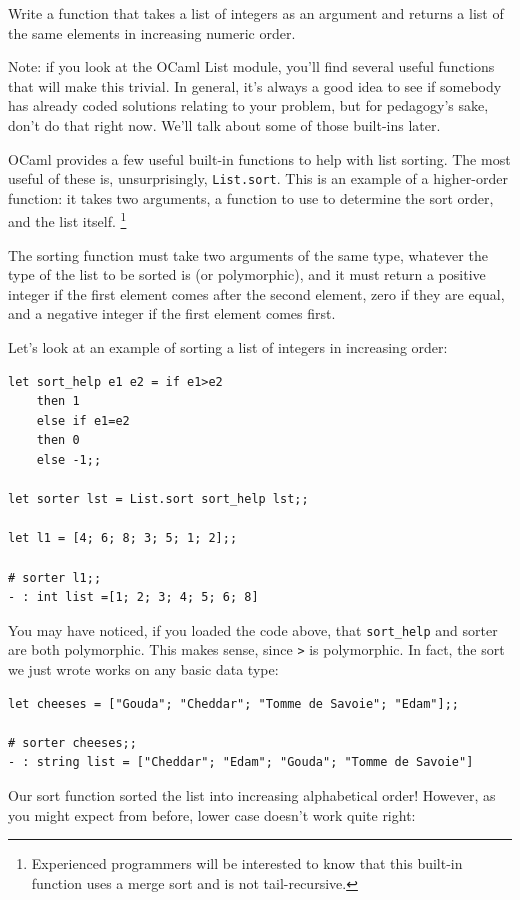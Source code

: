 \documentclass[10pt]{book}
\begin{document}
\begin{ex}
Write a function that takes a list of integers as an argument 
and returns a list of the same elements in increasing numeric 
order.

Note: if you look at the OCaml List module, you'll find several
useful functions that will make this trivial. In general, it's 
always a good idea to see if somebody has already coded solutions 
relating to your problem, but for pedagogy's sake, don't do that 
right now. We'll talk about some of those built-ins later.
\end{ex}

OCaml provides a few useful built-in functions to help with list 
sorting. The most useful of these is, unsurprisingly, {\tt List.sort}.
This is an example of a higher-order function: it takes two arguments, 
a function to use to determine the sort order, and the list itself.
\footnote{Experienced programmers will be interested to know that this 
built-in function uses a merge sort and is not tail-recursive.}

The sorting function must take two arguments of the same type, whatever 
the type of the list to be sorted is (or polymorphic), and it must return
a positive integer if the first element comes after the second element, 
zero if they are equal, and a negative integer if the first element comes 
first.

Let's look at an example of sorting a list of integers in increasing order:

\beforeverb
\begin{verbatim}
let sort_help e1 e2 = if e1>e2
	then 1
	else if e1=e2
	then 0
	else -1;;

let sorter lst = List.sort sort_help lst;;

let l1 = [4; 6; 8; 3; 5; 1; 2];;

# sorter l1;;
- : int list =[1; 2; 3; 4; 5; 6; 8]
\end{verbatim}
\afterverb

You may have noticed, if you loaded the code above, that
\verb"sort_help" and sorter are both polymorphic. This makes sense, 
since {\tt >} is polymorphic. In fact, the sort we just wrote
works on any basic data type:

\beforeverb
\begin{verbatim}
let cheeses = ["Gouda"; "Cheddar"; "Tomme de Savoie"; "Edam"];;

# sorter cheeses;;
- : string list = ["Cheddar"; "Edam"; "Gouda"; "Tomme de Savoie"]
\end{verbatim}
\afterverb
Our sort function sorted the list into increasing alphabetical order!
However, as you might expect from before, lower case doesn't work quite 
right:
\end{document}
